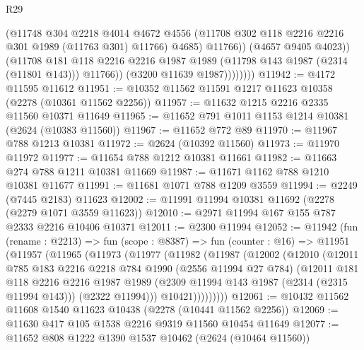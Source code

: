 \begin{lexlean}{R29}
\begin{coremodule}
                          (@11748
                            @304
                            @2218
                            @4014
                            @4672
                            @4556
                            (@11708 @302 @118 @2216 @2216 @301 @1989 (@11763 @301) @11766)
                            @4685)
                          @11766))
                      (@4657 @9405 @4023))
                    (@11708
                      @181
                      @118
                      @2216
                      @2216
                      @1987
                      @1989
                      (@11798 @143 @1987 (@2314 (@11801 @143)))
                      @11766))
                  (@3200 @11639 @1987))))))))
@11942 := @4172 @11595 @11612
@11951 := @10352 @11562 @11591 @1217 @11623 @10358 (@2278 (@10361 @11562 @2256))
@11957 := @11632 @1215 @2216 @2335 @11560 @10371 @11649
@11965 := @11652 @791 @1011 @1153 @1214 @10381 (@2624 (@10383 @11560))
@11967 := @11652 @772 @89
@11970 := @11967 @788 @1213 @10381
@11972 := @2624 (@10392 @11560)
@11973 := @11970 @11972
@11977 := @11654 @788 @1212 @10381 @11661
@11982 := @11663 @274 @788 @1211 @10381 @11669
@11987 := @11671 @1162 @788 @1210 @10381 @11677
@11991 := @11681 @1071 @788 @1209 @3559
@11994 := @2249 (@7445 @2183) @11623
@12002 := @11991 @11994 @10381 @11692 (@2278 (@2279 @1071 @3559 @11623))
@12010 := @2971 @11994 @167 @155 @787 @2333 @2216 @10406 @10371
@12011 := @2300 @11994
@12052 := @11942
    (fun (rename : @2213) =>
    fun (scope : @8387) =>
    fun (counter : @16) =>
    @11951
      (@11957
        (@11965
          (@11973
            (@11977
              (@11982
                (@11987
                  (@12002
                    (@12010
                      (@12011
                        @785
                        @183
                        @2216
                        @2218
                        @784
                        @1990
                        (@2556 @11994 @27 @784)
                        (@12011
                          @181
                          @118
                          @2216
                          @2216
                          @1987
                          @1989
                          (@2309 @11994 @143 @1987 (@2314 (@2315 @11994 @143)))
                          (@2322 @11994)))
                      @10421)))))))))
@12061 := @10432 @11562 @11608 @1540 @11623 @10438 (@2278 (@10441 @11562 @2256))
@12069 := @11630 @417 @105 @1538 @2216 @9319 @11560 @10454 @11649
@12077 := @11652 @808 @1222 @1390 @1537 @10462 (@2624 (@10464 @11560))

\end{coremodule}
\end{lexlean}
